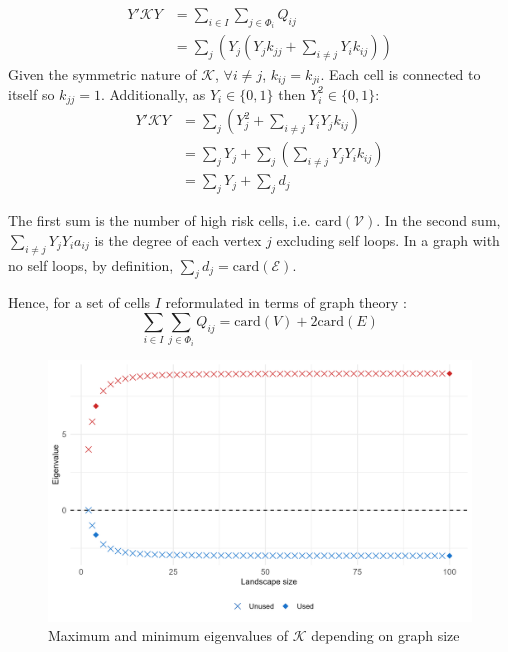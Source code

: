 \begin{align*}
    Y' \mathcal{K} Y &=\sum_{i \in I}\sum_{j \in \Phi_i}Q_{ij}\\
					 &= \sum_j\left( Y_j \left( Y_j k_{jj} + \sum_{i \neq j}Y_i k_{ij}\right)\right)
\end{align*}
Given the symmetric nature of $\mathcal{K}$, $\forall i \neq j$, $k_{ij}=k_{ji}$. Each cell is connected to itself so $k_{jj}=1$. Additionally, as $Y_i\in\{0,1\}$ then $Y_i^2 \in \{0,1\}$:
\begin{align*}
    Y'\mathcal{K} Y & =\sum_j \left(Y_j^2 + \sum_{i\neq j}Y_i Y_j k_{ij}\right)\\ 
          & = \sum_j Y_j + \sum_{j} \left(\sum_{i \neq j }Y_j Y_i k_{ij}\right)   \\
          & = \sum_j Y_j + \sum_{j} d_{j}
\end{align*}

The first sum is the number of high risk cells, i.e. $\mathrm{card}(\mathcal{V})$. 
In the second sum, $\sum_{i \neq j} Y_j Y_i a_{ij}$ is the degree of each vertex $j$ excluding self loops. In a graph with no self loops, by definition, $\sum_{j} d_j = \mathrm{card}(\mathcal{E})$.

Hence, for a set of cells $I$ reformulated in terms of graph theory : 
\begin{equation}
        \sum_{i \in I}\sum_{j \in \Phi_i}Q_{ij} = \mathrm{card}(V) + 2 \mathrm{card}(E)
\end{equation}

\begin{figure}[H]
    \centering
    \includegraphics[width=0.8\linewidth]{figures/wildland/eigenvalues.png}
    \caption{Maximum and minimum eigenvalues of $\mathcal{K}$ depending on graph size}
    \label{fig:eigenvalues}
\end{figure}




